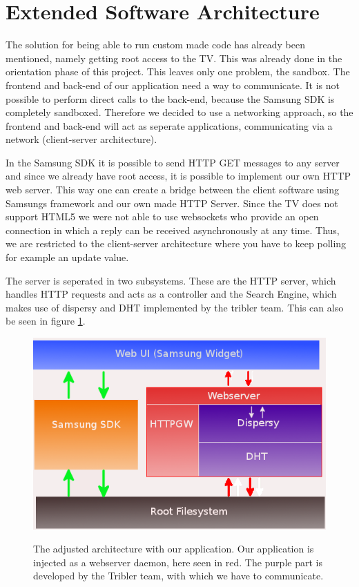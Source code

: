 \clearpage

\section{Extended Software Architecture}
The solution for being able to run custom made code has already been mentioned, namely getting root access to the TV.
This was already done in the orientation phase of this project. This leaves only one problem, the sandbox.
The frontend and back-end of our application need a way to communicate. It is not possible to perform direct calls to the back-end, because the 
Samsung SDK is completely sandboxed. Therefore we decided to use a networking approach, so the frontend and back-end will act as seperate 
applications, communicating via a network (client-server architecture).

In the Samsung SDK it is possible to send HTTP GET messages to any server and since we already have root access, it is possible to implement
our own HTTP web server. This way one can create a bridge between the client software using Samsung\textquotesingle s framework and our own made 
HTTP Server. Since the TV does not support HTML5 we were not able to use websockets who provide an open connection in which a reply can be 
received asynchronously at any time. Thus, we are restricted to the client-server architecture where you have to keep polling for example an 
update value.

The server is seperated in two subsystems. These are the HTTP server, which handles HTTP requests and acts as a controller and the Search Engine, 
which makes use of dispersy and DHT implemented by the tribler team. This can also be seen in figure \ref{fig:architecture}.

\begin{center}
\begin{figure}[h]
	\centering
	\mbox{\includegraphics[width=1\textwidth]{Images/architecture.png}}
	\label{fig:architecture}
	\caption{The adjusted architecture with our application. Our application is injected as a webserver daemon, here seen in red. 
	The purple part is developed by the Tribler team, with which we have to communicate.}
\end{figure}
\end{center}
\clearpage

